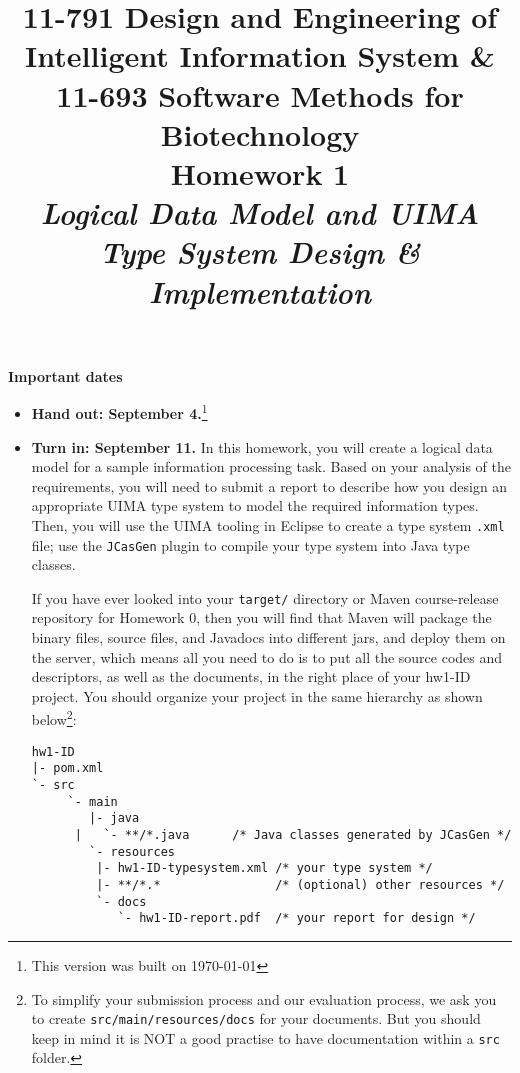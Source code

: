 \documentclass[oneside]{memoir}
\title{{\bfseries 11-791 Design and Engineering of Intelligent Information
System \& \\11-693 Software Methods for Biotechnology \\Homework 1}\\
\vspace{1em}
\itshape\rmfamily Logical Data Model and UIMA Type System Design \&
Implementation}
\date{}
\begin{document}
\begin{titlingpage}
\maketitle

\hspace{-0.1\textwidth}
\begin{minipage}{1.2\textwidth}
\vspace{-5em}
\textbf{Important dates}
\begin{itemize}

\item \textbf{Hand out: September 4.}\footnote{This version was built on \today}

\item \textbf{Turn in: September 11.} In this homework, you will create a
logical data model for a sample information processing task. Based on your
analysis of the requirements, you will need to submit a report to describe how
you design an appropriate UIMA type system to model the required information
types. Then, you will use the UIMA tooling in Eclipse to create a type system
\verb|.xml| file; use the \texttt{JCasGen} plugin to compile your type system
into Java type classes.

If you have ever looked into your \verb|target/| directory or Maven
course-release repository for Homework 0, then you will find that Maven will
package the binary files, source files, and Javadocs into different jars, and
deploy them on the server, which means all you need to do is to put all the
source codes and descriptors, as well as the documents, in the right place of
your hw1-ID project. You should organize your project in the same hierarchy as
shown below\footnote{To simplify your submission process and our evaluation
process, we ask you to create \texttt{src/main/resources/docs} for your
documents. But you should keep in mind it is NOT a good practise to have
documentation within a \texttt{src} folder.}:

\small
\begin{verbatim}
hw1-ID
|- pom.xml
`- src
     `- main
        |- java
      |   `- **/*.java      /* Java classes generated by JCasGen */ 
        `- resources
         |- hw1-ID-typesystem.xml /* your type system */
         |- **/*.*                /* (optional) other resources */
         `- docs
            `- hw1-ID-report.pdf  /* your report for design */

\end{verbatim}
\normalsize


\end{itemize}
\end{minipage}
\end{titlingpage}
\end{document}
